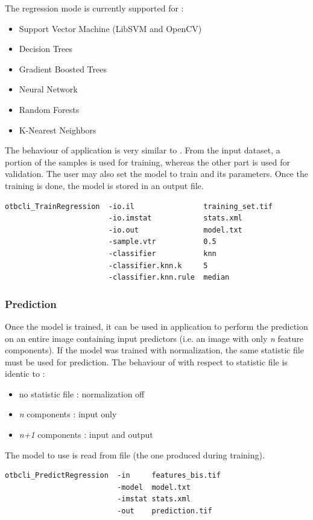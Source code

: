 The regression mode is currently supported for :
\begin{itemize}
\item Support Vector Machine (LibSVM and OpenCV)
\item Decision Trees
\item Gradient Boosted Trees
\item Neural Network
\item Random Forests
\item K-Nearest Neighbors
\end{itemize}

The behaviour of  application is very similar to
. From the input dataset, a portion of the samples
is used for training, whereas the other part is used for validation. The user may
also set the model to train and its parameters. Once the training is done, the
model is stored in an output file.

\begin{verbatim}
otbcli_TrainRegression  -io.il                training_set.tif
                        -io.imstat            stats.xml
                        -io.out               model.txt
                        -sample.vtr           0.5
                        -classifier           knn
                        -classifier.knn.k     5
                        -classifier.knn.rule  median
\end{verbatim}


\subsubsection{Prediction}

Once the model is trained, it can be used in  application
to perform the prediction on an entire image containing input predictors (i.e.
an image with only \textit{n} feature components). If the model was trained with
normalization, the same statistic file must be used for prediction. The behaviour
of  with respect to statistic file is identic to
 :
\begin{itemize}
\item no statistic file : normalization off
\item \textit{n} components :  input only
\item \textit{n+1} components : input and output
\end{itemize}

The model to use is read from file (the one produced during training).

\begin{verbatim}
otbcli_PredictRegression  -in     features_bis.tif
                          -model  model.txt
                          -imstat stats.xml
                          -out    prediction.tif
\end{verbatim}

